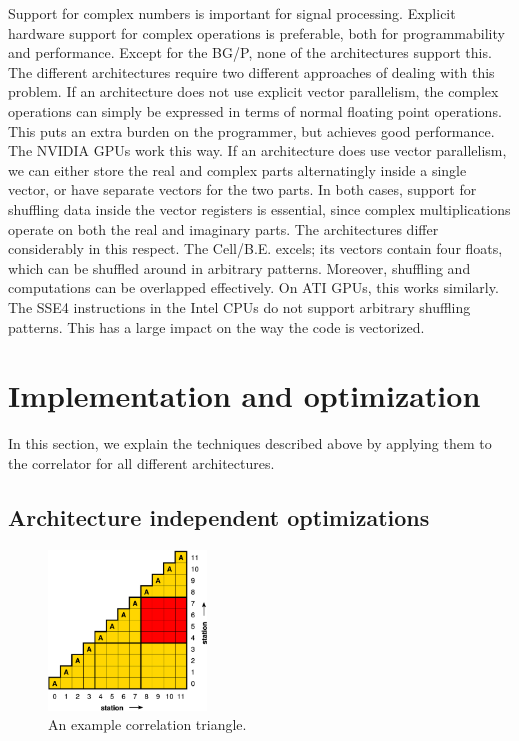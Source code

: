 \documentclass{article}
\begin{document}
Support for complex numbers is important for signal processing. 
Explicit hardware support for complex operations is
preferable, both for programmability and performance. 
Except for the BG/P, none of the architectures support this.
The different architectures require two different approaches of
dealing with this problem. If an architecture does not use
explicit vector parallelism, the complex operations can simply
be expressed in terms of normal floating point operations. This puts
an extra burden on the programmer, but achieves good performance. The
NVIDIA GPUs work this way.  If an architecture does use vector
parallelism, we can either store the real and complex parts alternatingly inside a
single vector, or have separate vectors for the two parts.  In both
cases, support for shuffling data inside the vector registers is
essential, since complex multiplications operate on both the real and imaginary parts.
The architectures differ considerably in this
respect.  The \mbox{Cell/B.E.} excels; its vectors contain four floats, which
can be shuffled around in arbitrary patterns. Moreover, 
shuffling and computations can be overlapped effectively.  On ATI
GPUs, this works similarly.  The SSE4 instructions in the
Intel CPUs do not support arbitrary shuffling patterns.
This has a large impact on the way the code is vectorized.




\section{Implementation and optimization}
\label{sec:optimizing}

In this section,
we explain the techniques described above by applying them to the
correlator for all different architectures.


\subsection{Architecture independent optimizations}
\label{sec:tiling}

\begin{figure}[t]
\begin{center}
\includegraphics[width=4.2cm]{figures/correlation-triangle.pdf}
\end{center}
\vspace{-0.5cm}
\caption{An example correlation triangle.}
\label{fig-correlation}
\end{figure}
\end{document}
